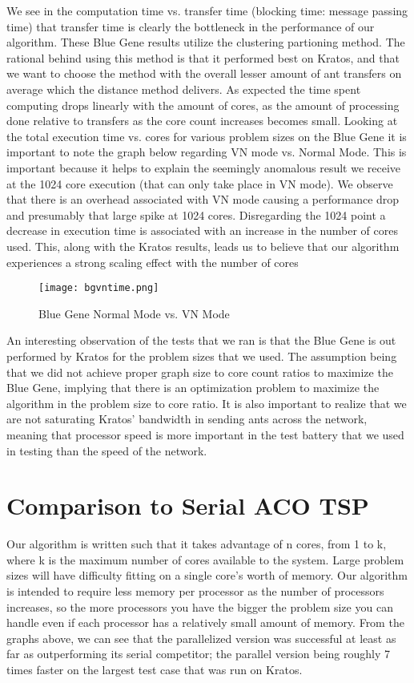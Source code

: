 \documentclass{acm_proc_article-sp}
\begin{document}
We see in the computation time vs. transfer time (blocking time: message passing time) that transfer time is clearly the bottleneck in the performance of our algorithm. These Blue Gene results utilize the clustering partioning method.
The rational behind using this method is that it performed best on Kratos, and that we want to choose the method with the overall lesser amount of ant transfers on average which the distance method delivers. As expected
the time spent computing drops linearly with the amount of cores, as the amount of processing done relative to transfers as the core count increases becomes small. Looking at the total execution time vs. cores for various
problem sizes on the Blue Gene it is important to note the graph below regarding VN mode vs. Normal Mode. This is important because it helps to explain the seemingly anomalous result we receive at the 1024 core execution (that can only take place in VN mode). We observe that there is an overhead associated with VN mode causing a performance drop and presumably that large spike at 1024 cores. Disregarding the 1024 point a decrease in execution time is associated with an increase in the number of cores used. This, along with the Kratos results, leads us to believe that our algorithm experiences a strong scaling effect with the number of cores

\begin{figure}[h!]
    \texttt{[image: bgvntime.png]}
    \caption{Blue Gene Normal Mode vs. VN Mode}
\end{figure}

An interesting observation of the tests that we ran is that the Blue Gene is out performed by Kratos for the problem sizes that we used. The assumption being that we did not achieve proper graph size to core count
ratios to maximize the Blue Gene, implying that there is an optimization problem to maximize the algorithm in the problem size to core ratio. It is also important to realize that we are not saturating Kratos' bandwidth
in sending ants across the network, meaning that processor speed is more important in the test battery that we used in testing than the speed of the network.

\section{Comparison to Serial ACO TSP}
Our algorithm is written such that it takes advantage of n cores, from 1 to k, where k is the maximum number of cores available to the system. Large problem sizes will have difficulty fitting on a single core's
worth of memory. Our algorithm is intended to require less memory per processor as the number of processors increases, so the more processors you have the bigger the problem size you can handle even if each processor
has a relatively small amount of memory. From the graphs above, we can see that the parallelized version was successful at least as far as outperforming its serial competitor; the parallel version being
roughly 7 times faster on the largest test case that was run on Kratos. 
\end{document}
